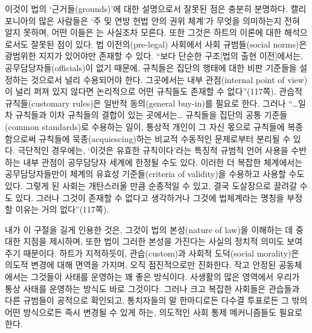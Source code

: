 이것이 법의 ‘근거들(grounds)’에 대한 설명으로서 잘못된 점은 충분히
분명하다. 캘리포니아의 많은 사람들은 ‘주 및 연방 헌법 안의 권위 체계’가
무엇을 의미하는지 전혀 알지 못하며, 어떤 이들은 는 사실조차 모른다. 또한 그것은 하트의 이론에
대한 해석으로서도 잘못된 점이 있다. 법 이전의(pre-legal) 사회에서 사회
규범들(social norms)은 광범위한 지지가 있어야만 존재할 수 있다. “보다
단순한 구조{[}법의 출현 이전{]}에서는, 공무담당자들(officials)이 없기
때문에, 규칙들은 집단의 행태에 대한 비판 기준들을 설정하는 것으로서 널리
수용되어야 한다. 그곳에서는 내부 관점(internal point of view)이 널리
퍼져 있지 않다면 논리적으로 어떤 규칙들도 존재할 수 없다”(117쪽).
관습적 규칙들(customary rules)은 일반적 동의(general buy-in)를 필요로
한다. 그러나 “\ldots 일차 규칙들과 이차 규칙들의 결합이 있는
곳에서는\ldots{} 규칙들을 집단의 공통 기준들(common standards)로
수용하는 일이, 통상적 개인이 그 자신 몫으로 규칙들에 복종함으로써
규칙들에 묵종(acquiescing)하는 비교적 수동적인 문제로부터 분리될 수
있다. 극단적인 경우에는, ‘이것은 유효한 규칙이다’라는 특징적 규범적 언어
사용을 수반하는 내부 관점이 공무담당자 세계에 한정될 수도 있다. 이러한
더 복잡한 체계에서는 공무담당자들만이 체계의 유효성 기준들(criteria of
validity)을 수용하고 사용할 수도 있다. 그렇게 된 사회는 개탄스러울 만큼
순종적일 수 있고, 결국 도살장으로 끌려갈 수도 있다. 그러나 그것이 존재할
수 없다고 생각하거나 그것에 법체계라는 명칭을 부정할 이유는 거의
없다”(117쪽).

내가 이 구절을 길게 인용한 것은, 그것이 법의 본성(nature of law)을
이해하는 데 중대한 지점을 제시하며, 또한 법이 그러한 본성을 가진다는
사실의 정치적 의미도 보여주기 때문이다. 하트가 지적하듯이,
관습(custom)과 사회적 도덕(social morality)은 의도적 변경에 대해 면역을
가지며, 오직 점진적으로만 진화한다. 작고 안정된 공동체에서는 그것들이
사태를 운영하는 꽤 좋은 방식이다. 사생활의 많은 영역에서 우리가 통상
사태를 운영하는 방식도 바로 그것이다. 그러나 크고 복잡한 사회들은
관습들과 다른 규범들이 공적으로 확인되고, 통치자들의 말 한마디로든
다수결 투표로든 그 밖의 어떤 방식으로든 즉시 변경될 수 있게 하는,
의도적인 사회 통제 메커니즘들도 필요로 한다.

